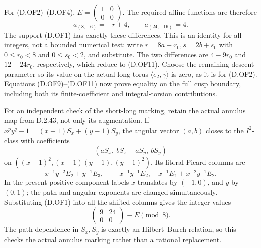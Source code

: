 For (D.OF2)--(D.OF4), \(E=\left(\begin{smallmatrix}1&0\\0&0
\end{smallmatrix}\right)\). The required affine functions are
therefore
\[
             a_{(8,-6)}=-r+4,\qquad a_{(24,-16)}=4.
                                                               \tag{D.OF11}
\]
The support (D.OF1) has exactly these differences.
This is an identity for all integers, not a bounded numerical
test: write \(r=8a+r_0,s=2b+s_0\) with \(0\le r_0<8\) and
\(0\le s_0<2\), and substitute. The two differences are
\(4-9r_0\) and \(12-24r_0\), respectively, which reduce to
(D.OF11).
Choose the remaining descent parameter so its value on the
actual long torus \(\langle e_2,\gamma\rangle\) is zero,
as it is for (D.OF2).
Equations (D.OF9)--(D.OF11) now prove equality on the full
cusp boundary, including both its finite-coefficient and
integral-torsion contributions.

For an independent check of the short-long marking, retain the
actual annulus map from D.2.43, not only its augmentation.
If \(x^py^q-1=(x-1)S_x+(y-1)S_y\), the angular vector \((a,b)\)
closes to the \(I^2\)-class with coefficients
\[
             (aS_x,\ bS_x+aS_y,\ bS_y)                   \tag{D.OF12}
\]
on \(((x-1)^2,(x-1)(y-1),(y-1)^2)\).
Its literal Picard columns are
\[
 x^{-1}y^{-2}E_2+y^{-1}E_3,\quad
       -x^{-1}y^{-1}E_2,\quad
       x^{-1}E_1+x^{-2}y^{-1}E_2.                        \tag{D.OF13}
\]
In the present positive component labels \(x\) translates by
\((-1,0)\), and \(y\) by \((0,1)\); the path and angular exponents
are changed simultaneously. Substituting (D.OF1) into all the
shifted columns gives the integer values
\[
                         \begin{pmatrix}9&24\\0&0\end{pmatrix}
                  \equiv E\pmod8.                       \tag{D.OF14}
\]
The path dependence in \(S_x,S_y\) is exactly an
Hilbert--Burch relation, so this checks the actual annulus
marking rather than a rational replacement.


